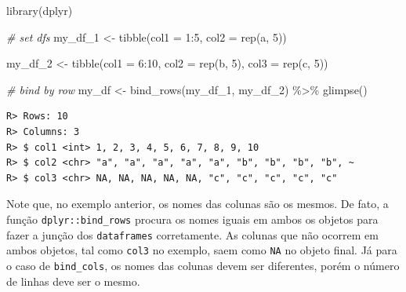 \documentclass[
  11pt,
]{book}
\newenvironment{Shaded}{\begin{snugshade}}{\end{snugshade}}
\newcommand{\AttributeTok}[1]{\textcolor[rgb]{0.61,0.61,0.61}{#1}}
\newcommand{\CommentTok}[1]{\textcolor[rgb]{0.37,0.37,0.37}{\textit{#1}}}
\newcommand{\DecValTok}[1]{\textcolor[rgb]{0.06,0.06,0.06}{#1}}
\newcommand{\FunctionTok}[1]{\textcolor[rgb]{0,0,0}{#1}}
\newcommand{\NormalTok}[1]{#1}
\newcommand{\OtherTok}[1]{\textcolor[rgb]{0.37,0.37,0.37}{#1}}
\newcommand{\SpecialCharTok}[1]{\textcolor[rgb]{0,0,0}{#1}}
\newcommand{\StringTok}[1]{\textcolor[rgb]{0.5,0.5,0.5}{#1}}
\begin{document}
\begin{Shaded}
\begin{Highlighting}[]
\FunctionTok{library}\NormalTok{(dplyr)}

\CommentTok{\# set dfs}
\NormalTok{my\_df\_1 }\OtherTok{\textless{}{-}} \FunctionTok{tibble}\NormalTok{(}\AttributeTok{col1 =} \DecValTok{1}\SpecialCharTok{:}\DecValTok{5}\NormalTok{,}
                  \AttributeTok{col2 =} \FunctionTok{rep}\NormalTok{(}\StringTok{\textquotesingle{}a\textquotesingle{}}\NormalTok{, }\DecValTok{5}\NormalTok{))}

\NormalTok{my\_df\_2 }\OtherTok{\textless{}{-}} \FunctionTok{tibble}\NormalTok{(}\AttributeTok{col1 =} \DecValTok{6}\SpecialCharTok{:}\DecValTok{10}\NormalTok{,}
                  \AttributeTok{col2 =} \FunctionTok{rep}\NormalTok{(}\StringTok{\textquotesingle{}b\textquotesingle{}}\NormalTok{, }\DecValTok{5}\NormalTok{),}
                  \AttributeTok{col3 =} \FunctionTok{rep}\NormalTok{(}\StringTok{\textquotesingle{}c\textquotesingle{}}\NormalTok{, }\DecValTok{5}\NormalTok{))}

\CommentTok{\# bind by row}
\NormalTok{my\_df }\OtherTok{\textless{}{-}} \FunctionTok{bind\_rows}\NormalTok{(my\_df\_1, my\_df\_2) }\SpecialCharTok{\%\textgreater{}\%}
  \FunctionTok{glimpse}\NormalTok{()}
\end{Highlighting}
\end{Shaded}

\begin{verbatim}
R> Rows: 10
R> Columns: 3
R> $ col1 <int> 1, 2, 3, 4, 5, 6, 7, 8, 9, 10
R> $ col2 <chr> "a", "a", "a", "a", "a", "b", "b", "b", "b", ~
R> $ col3 <chr> NA, NA, NA, NA, NA, "c", "c", "c", "c", "c"
\end{verbatim}

Note que, no exemplo anterior, os nomes das colunas são os mesmos. De fato, a função \texttt{dplyr::bind\_rows} procura os nomes iguais em ambos os objetos para fazer a junção dos \texttt{dataframes} corretamente. As colunas que não ocorrem em ambos objetos, tal como \texttt{col3} no exemplo, saem como \texttt{NA} no objeto final. Já para o caso de \texttt{bind\_cols}, os nomes das colunas devem ser diferentes, porém o número de linhas deve ser o mesmo.
\end{document}
